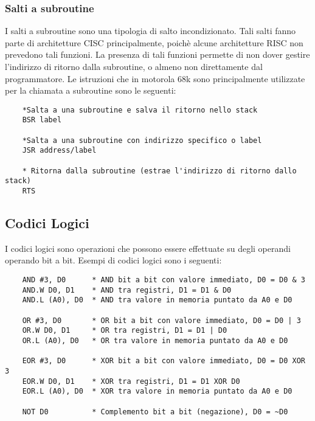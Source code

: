 \newpage

\subsubsection{Salti a subroutine}
I salti a subroutine sono una tipologia di salto incondizionato. Tali salti fanno parte di architetture CISC principalmente, poichè alcune architetture RISC non prevedono tali funzioni. La presenza di tali funzioni permette di non dover gestire l'indirizzo di ritorno dalla subroutine, o almeno non direttamente dal programmatore. Le istruzioni che in motorola 68k sono principalmente utilizzate per la chiamata a subroutine sono le seguenti:
\begin{lstlisting}
    *Salta a una subroutine e salva il ritorno nello stack
    BSR label   

    *Salta a una subroutine con indirizzo specifico o label
    JSR address/label
    
    * Ritorna dalla subroutine (estrae l'indirizzo di ritorno dallo stack)
    RTS            
\end{lstlisting}

\subsection{Codici Logici}
I codici logici sono operazioni che possono essere effettuate su degli operandi operando bit a bit. Esempi di codici logici sono i seguenti:
\begin{lstlisting}
    AND #3, D0      * AND bit a bit con valore immediato, D0 = D0 & 3  
    AND.W D0, D1    * AND tra registri, D1 = D1 & D0  
    AND.L (A0), D0  * AND tra valore in memoria puntato da A0 e D0  

    OR #3, D0       * OR bit a bit con valore immediato, D0 = D0 | 3  
    OR.W D0, D1     * OR tra registri, D1 = D1 | D0  
    OR.L (A0), D0   * OR tra valore in memoria puntato da A0 e D0  

    EOR #3, D0      * XOR bit a bit con valore immediato, D0 = D0 XOR 3  
    EOR.W D0, D1    * XOR tra registri, D1 = D1 XOR D0  
    EOR.L (A0), D0  * XOR tra valore in memoria puntato da A0 e D0  

    NOT D0          * Complemento bit a bit (negazione), D0 = ~D0  
\end{lstlisting}

\newpage

